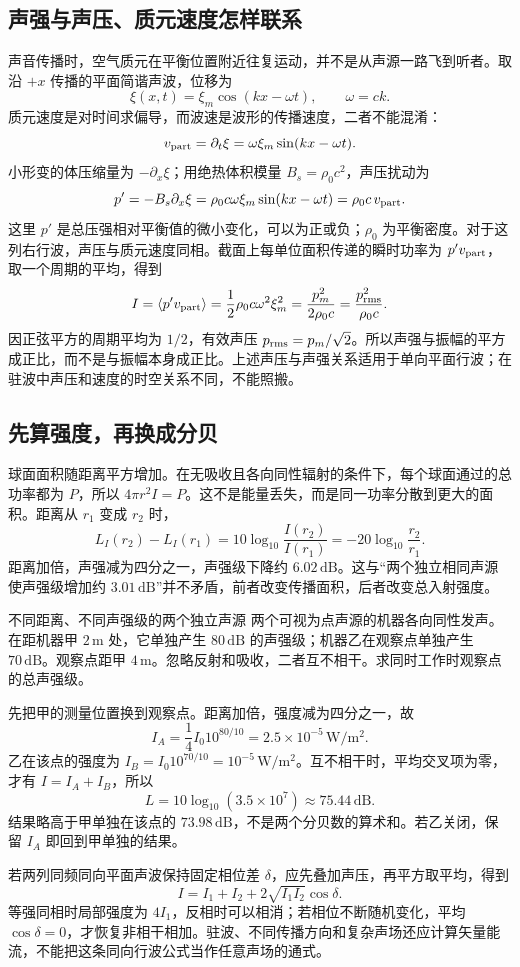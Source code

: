 \subsection{声强与声压、质元速度怎样联系}
声音传播时，空气质元在平衡位置附近往复运动，并不是从声源一路飞到听者。取沿 $+x$ 传播的平面简谐声波，位移为
\[
 \xi(x,t)=\xi_m\cos(kx-\omega t),\qquad \omega=ck.
\]
质元速度是对时间求偏导，而波速是波形的传播速度，二者不能混淆：
\[
 v_{\rm part}=\partial_t\xi=\omega\xi_m\sin(kx-\omega t).
\]
小形变的体压缩量为 $-\partial_x\xi$；用绝热体积模量 $B_s=\rho_0c^2$，声压扰动为
\[
 p'=-B_s\partial_x\xi
 =\rho_0c\omega\xi_m\sin(kx-\omega t)
 =\rho_0c\,v_{\rm part}.
\]
这里 $p'$ 是总压强相对平衡值的微小变化，可以为正或负；$\rho_0$ 为平衡密度。对于这列右行波，声压与质元速度同相。截面上每单位面积传递的瞬时功率为 $p'v_{\rm part}$，取一个周期的平均，得到
\[
 I=\langle p'v_{\rm part}\rangle
 =\frac12\rho_0c\omega^2\xi_m^2
 =\frac{p_m^2}{2\rho_0c}
 =\frac{p_{\rm rms}^2}{\rho_0c}.
\]
因正弦平方的周期平均为 $1/2$，有效声压 $p_{\rm rms}=p_m/\sqrt2$。所以声强与振幅的平方成正比，而不是与振幅本身成正比。上述声压与声强关系适用于单向平面行波；在驻波中声压和速度的时空关系不同，不能照搬。

\subsection{先算强度，再换成分贝}
球面面积随距离平方增加。在无吸收且各向同性辐射的条件下，每个球面通过的总功率都为 $P$，所以 $4\pi r^2I=P$。这不是能量丢失，而是同一功率分散到更大的面积。距离从 $r_1$ 变成 $r_2$ 时，
\[
 L_I(r_2)-L_I(r_1)
 =10\log_{10}\frac{I(r_2)}{I(r_1)}
 =-20\log_{10}\frac{r_2}{r_1}.
\]
距离加倍，声强减为四分之一，声强级下降约 $6.02\,\mathrm{dB}$。这与“两个独立相同声源使声强级增加约 $3.01\,\mathrm{dB}$”并不矛盾，前者改变传播面积，后者改变总入射强度。

\begin{origexamplebox}{不同距离、不同声强级的两个独立声源}\label{ch12:ex:teaching-sound-distance}
两个可视为点声源的机器各向同性发声。在距机器甲 $2\,\mathrm m$ 处，它单独产生 $80\,\mathrm{dB}$ 的声强级；机器乙在观察点单独产生 $70\,\mathrm{dB}$。观察点距甲 $4\,\mathrm m$。忽略反射和吸收，二者互不相干。求同时工作时观察点的总声强级。
\end{origexamplebox}
\begin{xesolution}
先把甲的测量位置换到观察点。距离加倍，强度减为四分之一，故
\[
 I_A=\frac14I_0 10^{80/10}=2.5\times10^{-5}\,\mathrm{W/m^2}.
\]
乙在该点的强度为 $I_B=I_0 10^{70/10}=10^{-5}\,\mathrm{W/m^2}$。互不相干时，平均交叉项为零，才有 $I=I_A+I_B$，所以
\[
 L=10\log_{10}(3.5\times10^7)\approx75.44\,\mathrm{dB}.
\]
结果略高于甲单独在该点的 $73.98\,\mathrm{dB}$，不是两个分贝数的算术和。若乙关闭，保留 $I_A$ 即回到甲单独的结果。
\end{xesolution}

若两列同频同向平面声波保持固定相位差 $\delta$，应先叠加声压，再平方取平均，得到
\[
 I=I_1+I_2+2\sqrt{I_1I_2}\cos\delta.
\]
等强同相时局部强度为 $4I_1$，反相时可以相消；若相位不断随机变化，平均 $\cos\delta=0$，才恢复非相干相加。驻波、不同传播方向和复杂声场还应计算矢量能流，不能把这条同向行波公式当作任意声场的通式。
